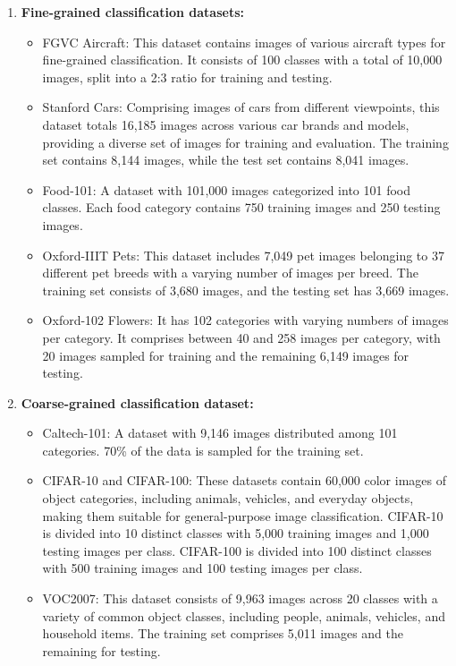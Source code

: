 \begin{enumerate}
    \item \textbf{Fine-grained classification datasets:}
    \begin{itemize}
    \vspace{1em}
        \item FGVC Aircraft: This dataset contains images of various aircraft types for fine-grained classification. It consists of 100 classes with a total of 10,000 images, split into a 2:3 ratio for training and testing.
        \item Stanford Cars: Comprising images of cars from different viewpoints, this dataset totals 16,185 images across various car brands and models, providing a diverse set of images for training and evaluation.
        The training set contains 8,144 images, while the test set contains 8,041 images.
        \item Food-101: A dataset with 101,000 images categorized into 101 food classes. Each food category contains 750 training images and 250 testing images.
        \item Oxford-IIIT Pets: This dataset includes 7,049 pet images belonging to 37 different pet breeds with a varying number of images per breed. The training set consists of 3,680 images, and the testing set has 3,669 images.
        \item Oxford-102 Flowers: It has 102 categories with varying numbers of images per category. It comprises between 40 and 258 images per category, with 20 images sampled for training and the remaining 6,149 images for testing.
    \end{itemize}
    
    \item \textbf{Coarse-grained classification dataset:}
    \begin{itemize}
    \vspace{1em}
        \item Caltech-101: A dataset with 9,146 images distributed among 101 categories. 70\% of the data is sampled for the training set.
        \item CIFAR-10 and CIFAR-100: These datasets contain 60,000 color images of object categories, including animals, vehicles, and everyday objects, making them suitable for general-purpose image classification. CIFAR-10 is divided into 10 distinct classes with 5,000 training images and 1,000 testing images per class. CIFAR-100 is divided into 100 distinct classes with 500 training images and 100 testing images per class.
        \item VOC2007: This dataset consists of 9,963 images across 20 classes with a variety of common object classes, including people, animals, vehicles, and household items. The training set comprises 5,011 images and the remaining for testing.
    \end{itemize}
    

\end{enumerate}
